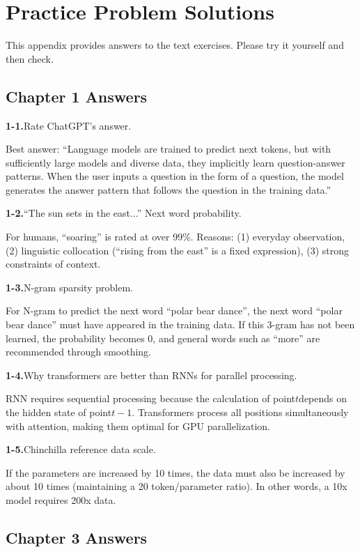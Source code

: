 \chapter{Practice Problem Solutions}
\label{app:answers}

This appendix provides answers to the text exercises. Please try it yourself and then check.

\section{Chapter 1 Answers}

\textbf{1-1.}Rate ChatGPT’s answer.

Best answer: ``Language models are trained to predict next tokens, but with sufficiently large models and diverse data, they implicitly learn question-answer patterns. When the user inputs a question in the form of a question, the model generates the answer pattern that follows the question in the training data.''

\textbf{1-2.}``The sun sets in the east...'' Next word probability.

For humans, ``soaring'' is rated at over 99\%. Reasons: (1) everyday observation, (2) linguistic collocation (``rising from the east'' is a fixed expression), (3) strong constraints of context.

\textbf{1-3.}N-gram sparsity problem.

For N-gram to predict the next word ``polar bear dance'', the next word ``polar bear dance'' must have appeared in the training data. If this 3-gram has not been learned, the probability becomes 0, and general words such as ``more'' are recommended through smoothing.

\textbf{1-4.}Why transformers are better than RNNs for parallel processing.

RNN requires sequential processing because the calculation of point$t$depends on the hidden state of point$t-1$. Transformers process all positions simultaneously with attention, making them optimal for GPU parallelization.

\textbf{1-5.}Chinchilla reference data scale.

If the parameters are increased by 10 times, the data must also be increased by about 10 times (maintaining a 20 token/parameter ratio). In other words, a 10x model requires 200x data.

\section{Chapter 3 Answers}

